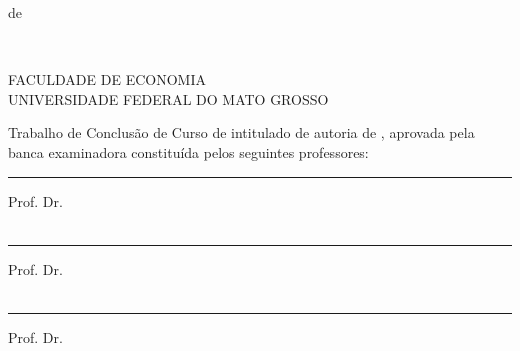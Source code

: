 \documentclass{tcc}
\begin{document}
\vfill
\begin{center}
\MONTH de \the\year
\end{center}

\newpage

$ $
\vfill


\begin{flushright}
\end{flushright}

\newpage


\begin{center}
FACULDADE DE ECONOMIA \\
UNIVERSIDADE FEDERAL DO MATO GROSSO
\end{center}

\vspace{0.05in}

Trabalho de Conclusão de Curso de \nomedocurso intitulado \textit{\bf \em \thetitle} de autoria de \theauthor, aprovada pela banca examinadora constituída pelos seguintes professores: \\

\vspace{0.7in}

\hrule
\noindent Prof. Dr. \profa\\
\insta\\

\vspace{0.25in}

\hrule
\noindent Prof. Dr. \profb\\
\instb\\

\vspace{0.25in}

\hrule
\noindent Prof. Dr. \profc\\
\instc\\

\vspace{0.8in}
\end{document}
